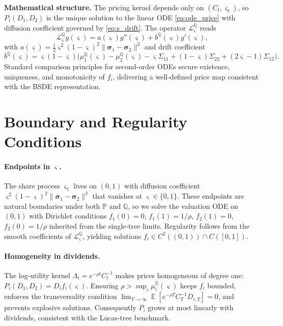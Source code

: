 ﻿\documentclass[11pt,letterpaper,oneside]{article}
\numberwithin{equation}{section}
\DeclareMathOperator{\E}{\mathbb{E}}
\newcommand{\1}{\mathbf{1}}
\begin{document}
\begin{tcolorbox}[mathstyle]
\textbf{Mathematical structure.} The pricing kernel depends only on $(C_t,\varsigma_t)$, so $P_i(D_1,D_2)$ is the unique solution to the linear ODE \eqref{eq:ode_price} with diffusion coefficient governed by \eqref{eq:s_drift}. The operator $\mathcal{L}^{\mathbb{Q}}_{\varsigma}$ reads
\begin{equation*}
  \mathcal{L}^{\mathbb{Q}}_{\varsigma} g(\varsigma) = a(\varsigma) g''(\varsigma) + b^{\mathbb{Q}}(\varsigma) g'(\varsigma),
\end{equation*}
with $a(\varsigma)=\tfrac12 \varsigma^2(1-\varsigma)^2 \lVert \bm{\sigma}_1-\bm{\sigma}_2\rVert^2$ and drift coefficient
\begin{equation*}
  b^{\mathbb{Q}}(\varsigma)=\varsigma(1-\varsigma)\Big(\mu_1^{\mathbb{Q}}(\varsigma)-\mu_2^{\mathbb{Q}}(\varsigma)-\varsigma\Sigma_{11}+(1-\varsigma)\Sigma_{22}+(2\varsigma-1)\Sigma_{12}\Big).
\end{equation*}
Standard comparison principles for second-order ODEs secure existence, uniqueness, and monotonicity of $f_i$, delivering a well-defined price map consistent with the BSDE representation.
\end{tcolorbox}
\section{Boundary and Regularity Conditions}

\paragraph{Endpoints in $\varsigma$.} The share process $\varsigma_t$ lives on $(0,1)$ with diffusion coefficient $\varsigma^2(1-\varsigma)^2\lVert\bm{\sigma}_1-\bm{\sigma}_2\rVert^2$ that vanishes at $\varsigma\in\{0,1\}$. These endpoints are natural boundaries under both $\mathbb{P}$ and $\mathbb{Q}$, so we solve the valuation ODE on $(0,1)$ with Dirichlet conditions $f_1(0)=0$, $f_1(1)=1/\rho$, $f_2(1)=0$, $f_2(0)=1/\rho$ inherited from the single-tree limits. Regularity follows from the smooth coefficients of $\mathcal{L}^{\mathbb{Q}}_{\varsigma}$, yielding solutions $f_i\in C^2((0,1))\cap C([0,1])$.

\paragraph{Homogeneity in dividends.} The log-utility kernel $\Lambda_t=e^{-\rho t}C_t^{-1}$ makes prices homogeneous of degree one: $P_i(D_1,D_2)=D_i f_i(\varsigma)$. Ensuring $\rho>\sup_{\varsigma}\mu_i^{\mathbb{Q}}(\varsigma)$ keeps $f_i$ bounded, enforces the transversality condition $\lim_{T\to\infty}\E[e^{-\rho T}C_T^{-1}D_{i,T}]=0$, and prevents explosive solutions. Consequently $P_i$ grows at most linearly with dividends, consistent with the Lucas-tree benchmark.
\end{document}
